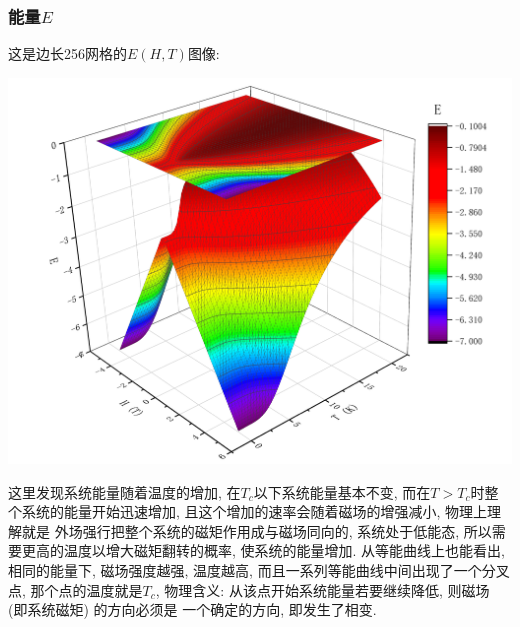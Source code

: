 \documentclass[UTF8]{ctexart}
\begin{document}
            \subsubsection{能量$E$}
                \indent 这是边长256网格的$E(H,T)$图像:
                \begin{center}
                    \includegraphics[width=17cm]{E-HT256.pdf}
                \end{center}
                这里发现系统能量随着温度的增加, 在$T_c$以下系统能量基本不变, 而在$T>T_c$时整个系统的能量开始迅速增加, 且这个增加的速率会随着磁场的增强减小, 物理上理解就是
                外场强行把整个系统的磁矩作用成与磁场同向的, 系统处于低能态, 所以需要更高的温度以增大磁矩翻转的概率, 使系统的能量增加. 从等能曲线上也能看出, 相同的能量下,
                磁场强度越强, 温度越高, 而且一系列等能曲线中间出现了一个分叉点, 那个点的温度就是$T_c$, 物理含义: 从该点开始系统能量若要继续降低, 则磁场 (即系统磁矩) 的方向必须是
                一个确定的方向, 即发生了相变.
                \newpage
\end{document}
